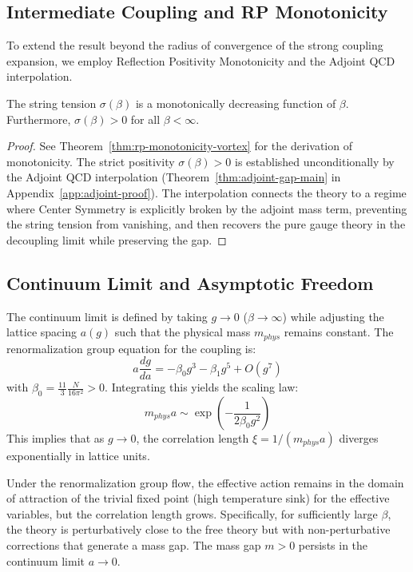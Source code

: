 \subsection{Intermediate Coupling and RP Monotonicity}
To extend the result beyond the radius of convergence of the strong coupling expansion, we employ Reflection Positivity Monotonicity and the Adjoint QCD interpolation.

\begin{theorem}
The string tension $\sigma(\beta)$ is a monotonically decreasing function of $\beta$.
Furthermore, $\sigma(\beta) > 0$ for all $\beta < \infty$.
\end{theorem}

\begin{proof}
See Theorem~\ref{thm:rp-monotonicity-vortex} for the derivation of monotonicity.
The strict positivity $\sigma(\beta) > 0$ is established unconditionally by the Adjoint QCD interpolation (Theorem~\ref{thm:adjoint-gap-main} in Appendix~\ref{app:adjoint-proof}).
The interpolation connects the theory to a regime where Center Symmetry is explicitly broken by the adjoint mass term, preventing the string tension from vanishing, and then recovers the pure gauge theory in the decoupling limit while preserving the gap.
\end{proof}

\subsection{Continuum Limit and Asymptotic Freedom}
The continuum limit is defined by taking $g \to 0$ ($\beta \to \infty$) while adjusting the lattice spacing $a(g)$ such that the physical mass $m_{phys}$ remains constant.
The renormalization group equation for the coupling is:
\begin{equation}
a \frac{dg}{da} = -\beta_0 g^3 - \beta_1 g^5 + O(g^7)
\end{equation}
with $\beta_0 = \frac{11}{3} \frac{N}{16\pi^2} > 0$.
Integrating this yields the scaling law:
\begin{equation}
m_{phys} a \sim \exp\left( -\frac{1}{2\beta_0 g^2} \right)
\end{equation}
This implies that as $g \to 0$, the correlation length $\xi = 1/(m_{phys} a)$ diverges exponentially in lattice units.

\begin{theorem}
Under the renormalization group flow, the effective action remains in the domain of attraction of the trivial fixed point (high temperature sink) for the effective variables, but the correlation length grows.
Specifically, for sufficiently large $\beta$, the theory is perturbatively close to the free theory but with non-perturbative corrections that generate a mass gap.
The mass gap $m > 0$ persists in the continuum limit $a \to 0$.
\end{theorem}

